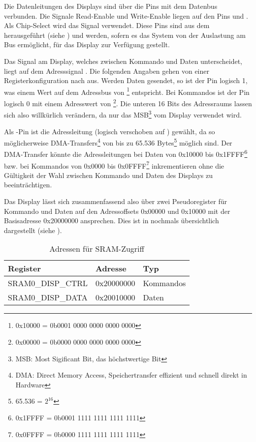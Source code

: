 Die Datenleitungen des Displays sind über die Pins  mit dem Datenbus verbunden. Die Signale Read-Enable  und Write-Enable  liegen auf den Pins  und . Als Chip-Select wird das Signal  verwendet. Diese Pins sind aus dem  herausgeführt (siehe ) und werden, sofern es das System von der Auslastung am Bus ermöglicht, für das Display zur Verfügung gestellt.

Das  Signal am Display, welches zwischen Kommando und Daten unterscheidet, liegt auf dem Adresssignal . Die folgenden Angaben gehen von einer Registerkonfiguration nach  aus. Werden Daten gesendet, so ist der Pin logisch 1, was einem Wert auf dem Adressbus von \footnote{0x10000 = 0b0001 0000 0000 0000 0000} entspricht. Bei Kommandos ist der Pin logisch 0 mit einem Adresswert von \footnote{0x00000 = 0b0000 0000 0000 0000 0000}. Die unteren 16 Bits des Adressraums lassen sich also willkürlich verändern, da nur das MSB\footnote{MSB: Most Sigificant Bit, das höchstwertige Bit} vom Display verwendet wird. 

Als -Pin ist die Adressleitung  (logisch verschoben auf ) gewählt, da so möglicherweise DMA-Transfers\footnote{DMA: Direct Memory Access, Speichertransfer effizient und schnell direkt in Hardware} von bis zu 65.536 Bytes\footnote{65.536 = $2^{16}$} möglich sind. Der DMA-Transfer könnte die Adressleitungen bei Daten von 0x10000 bis 0x1FFFF\footnote{0x1FFFF = 0b0001 1111 1111 1111 1111} bzw. bei Kommandos von 0x0000 bis 0x0FFFF\footnote{0x0FFFF = 0b0000 1111 1111 1111 1111} inkrementieren ohne die Gültigkeit der Wahl zwischen Kommando und Daten des Displays zu beeinträchtigen.

Das Display lässt sich zusammenfassend also über zwei Pseudoregister für Kommando und Daten auf den Adressoffsets 0x00000 und 0x10000 mit der Basisadresse 0x20000000 ansprechen. Dies ist in  nochmals übersichtlich dargestellt (siehe \cite{NXP2010}).

\begin{table}[h]
\begin{tabular}{|p{4.5cm}|p{4cm}|p{4cm}|}\hline
\rowcolor{TableBackgroundColor} 
	\textbf{Register} 	& \textbf{Adresse} 	& \textbf{Typ} 			\\ \hline
	SRAM0\_DISP\_CTRL 	& 0x20000000		& Kommandos				\\ \hline
	SRAM0\_DISP\_DATA 	& 0x20010000 		& Daten 				\\ \hline
\end{tabular}
\caption{Adressen für SRAM-Zugriff}
\label{tab:sram_adressen}
\end{table}


